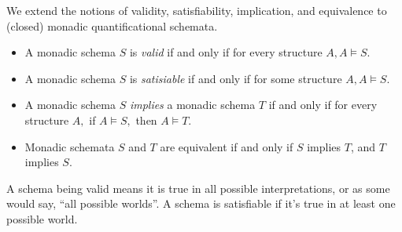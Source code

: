 We extend the notions of validity, satisfiability, implication, and equivalence to (closed) monadic quantificational schemata. 
\begin{itemize}
\item
A monadic schema $S$ is \emph{ valid} if and only if for every structure $A, A
\models S.$
\item
A monadic schema $S$ is \emph{ satisiable} if and only if for some structure $A,
A \models S.$
\item
A monadic schema $S$ \emph{ implies} a monadic schema $T$ if and only if for
every structure $A,$ if $A \models S,$ then $A \models T.$
\item
Monadic schemata $S$ and $T$ are equivalent if and only if $S$ implies $T$, and $T$ implies $S$. 
\end{itemize}

\begin{aside}
    A schema being valid means it is true in all possible interpretations, or as some would say, ``all possible worlds''. A schema is satisfiable if it's true in at least one possible world. 

\end{aside}